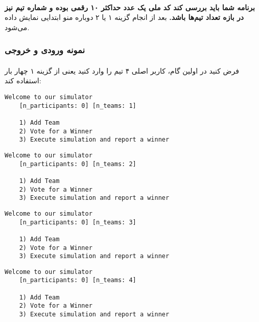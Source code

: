 \documentclass[../main.tex]{subfiles}
\begin{document}
\paragraph{}
\textbf{برنامه شما باید بررسی کند کد ملی یک عدد حداکثر ۱۰ رقمی بوده و شماره تیم نیز در بازه تعداد تیم‌ها باشد.}
بعد از انجام گزینه ۱ یا ۲ دوباره منو ابتدایی نمایش داده می‌شود.

\subsubsection{نمونه ورودی و خروجی}
\paragraph{}
فرض کنید در اولین گام، کاربر اصلی ۴ تیم را وارد کنید یعنی از گزینه ۱ چهار بار  استفاده کند:


\begin{latin}
\begin{lstlisting}[]
    Welcome to our simulator
    [n_participants: 0] [n_teams: 1]

    1) Add Team
    2) Vote for a Winner
    3) Execute simulation and report a winner
\end{lstlisting}
\end{latin}


\begin{latin}
\begin{lstlisting}[]
    Welcome to our simulator
    [n_participants: 0] [n_teams: 2]

    1) Add Team
    2) Vote for a Winner
    3) Execute simulation and report a winner
\end{lstlisting}
\end{latin}

\begin{latin}
\begin{lstlisting}[]
    Welcome to our simulator
    [n_participants: 0] [n_teams: 3]

    1) Add Team
    2) Vote for a Winner
    3) Execute simulation and report a winner
\end{lstlisting}
\end{latin}

\begin{latin}
\begin{lstlisting}[]
    Welcome to our simulator
    [n_participants: 0] [n_teams: 4]

    1) Add Team
    2) Vote for a Winner
    3) Execute simulation and report a winner
\end{lstlisting}
\end{latin}
\end{document}
